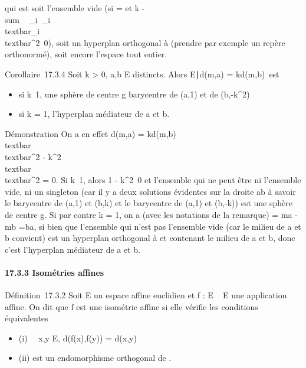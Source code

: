 \documentclass[]{article}
\begin{document}
qui est soit l'ensemble vide (si \overrightarrowu
= et k
-\\sum ~
\_i\inI\lambda~\_i\\textbar{}\overrightarrowaa\_i\\textbar{}^2\neq~0),
soit un hyperplan orthogonal à \overrightarrowu
(prendre par exemple un repère orthonormé), soit encore l'espace tout
entier.

Corollaire~17.3.4 Soit k \textgreater{} 0, a,b \in E distincts. Alors
\m \in E∣d(m,a) =
kd(m,b)\ est

\begin{itemize}
\itemsep1pt\parskip0pt
\item
  si k\neq~1, une sphère de centre g barycentre
  de (a,1) et de (b,-k^2)
\item
  si k = 1, l'hyperplan médiateur de a et b.
\end{itemize}

Démonstration On a en effet d(m,a) = kd(m,b)
\Leftrightarrow
\\textbar{}\overrightarrowma\\textbar{}^2
-
k^2\\textbar{}\overrightarrowmb\\textbar{}^2
= 0. Si k\neq~1, alors 1 -
k^2\neq~0 et l'ensemble qui ne peut
être ni l'ensemble vide, ni un singleton (car il y a deux solutions
évidentes sur la droite ab à savoir le barycentre de (a,1) et (b,k) et
le barycentre de (a,1) et (b,-k)) est une sphère de centre g. Si par
contre k = 1, on a (avec les notations de la remarque)
\overrightarrowu =\overrightarrow
ma -\overrightarrow mb
=\overrightarrow ba, si bien que l'ensemble qui n'est
pas l'ensemble vide (car le milieu de a et b convient) est un hyperplan
orthogonal à \overrightarrowba et contenant le milieu
de a et b, donc c'est l'hyperplan médiateur de a et b.

\paragraph{17.3.3 Isométries affines}

Définition~17.3.2 Soit E un espace affine euclidien et f : E \rightarrow~ E une
application affine. On dit que f est une isométrie affine si elle
vérifie les conditions équivalentes

\begin{itemize}
\itemsep1pt\parskip0pt
\item
  (i) \forall~~x,y \in E, d(f(x),f(y)) = d(x,y)
\item
  (ii) \vecf est un endomorphisme orthogonal de
  \overrightarrowE.
\end{itemize}
\end{document}
